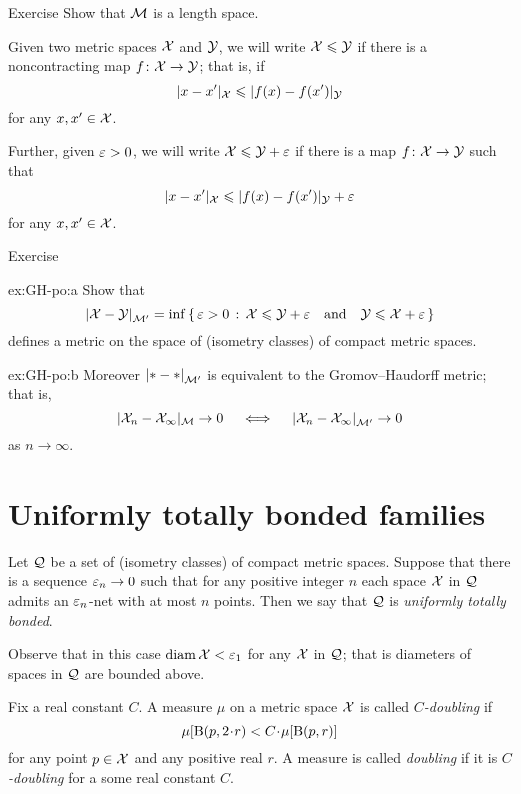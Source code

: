 \begin{thm}{Exercise}
Show that $\mathcal{M}$ is a length space.
\end{thm}

Given two metric spaces $\mathcal{X}$ and $\mathcal{Y}$, we will write $\mathcal{X}\leqslant \mathcal{Y}$ if there is a noncontracting map $f\colon\mathcal{X}\to \mathcal{Y}$;
that is, if 
$$ |x-x'|_{\mathcal{X}}\leqslant|f(x)-f(x')|_{\mathcal{Y}}$$
for any $x,x'\in \mathcal{X}$.

Further, given $\varepsilon>0$, we will write $\mathcal{X}\leqslant \mathcal{Y}+\varepsilon$
if there is a map $f\colon\mathcal{X}\to \mathcal{Y}$ such that 
$$|x-x'|_{\mathcal{X}}\leqslant|f(x)-f(x')|_{\mathcal{Y}}+\varepsilon$$
for any $x,x'\in \mathcal{X}$.

\begin{thm}{Exercise}\label{ex:GH-po}
\begin{subthm}{ex:GH-po:a}
Show that 
$$\dist{\spc{X}}{\spc{Y}}{\spc{M}'}=\inf\set{\eps>0}{\spc{X}\le \spc{Y}+\eps
\quad\text{and}\quad
\spc{Y}\le \spc{X}+\eps}$$
defines a metric on the space of (isometry classes) of compact metric spaces.
\end{subthm}

\begin{subthm}{ex:GH-po:b}
Moreover $\dist{*}{*}{\spc{M}'}$ is equivalent to the Gromov--Haudorff metric;
that is,
$$|\spc{X}_n-\spc{X}_\infty|_{\mathcal{M}}\to 0 
\quad\iff\quad 
\dist{\spc{X}_n}{\spc{X}_\infty}{\spc{M}'}\to 0$$ 
as $n\to\infty$.
\end{subthm}
\end{thm}


\section{Uniformly totally bonded families}

Let $\mathcal{Q}$ be a set of (isometry classes) of compact metric spaces.
Suppose that there is a sequence $\varepsilon_n\to 0$ such that for any positive integer $n$ each space $\mathcal{X}$ in $\mathcal{Q}$ admits an $\varepsilon_n$-net with at most $n$ points.
Then we say that $\mathcal{Q}$ is \emph{uniformly totally bonded}.

Observe that in this case $\operatorname{\rm diam}\nolimits\mathcal{X}<\varepsilon_1$ for any  $\mathcal{X}$ in $\mathcal{Q}$; that is diameters of spaces in $\mathcal{Q}$ are bounded above.

Fix a real constant $C$.
A measure $\mu$ on a metric space $\mathcal{X}$ is called \emph{$C$-doubling} if
\[\mu[\oBall(p,2\cdot r)< C\cdot\mu[\oBall(p,r)]\]
for any point $p\in \mathcal{X}$ and any positive real $r$.
A measure is called \emph{doubling} if it is {}\emph{$C$-doubling} for a some real constant $C$.

